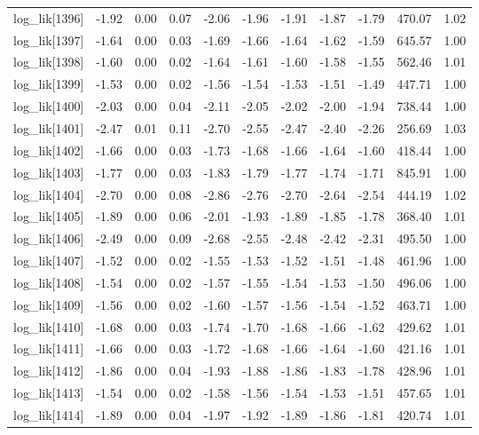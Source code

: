 \begin{table}[ht]
\begin{tabular}{rrrrrrrrrrr}
  log\_lik[1396] & -1.92 & 0.00 & 0.07 & -2.06 & -1.96 & -1.91 & -1.87 & -1.79 & 470.07 & 1.02 \\ 
  log\_lik[1397] & -1.64 & 0.00 & 0.03 & -1.69 & -1.66 & -1.64 & -1.62 & -1.59 & 645.57 & 1.00 \\ 
  log\_lik[1398] & -1.60 & 0.00 & 0.02 & -1.64 & -1.61 & -1.60 & -1.58 & -1.55 & 562.46 & 1.01 \\ 
  log\_lik[1399] & -1.53 & 0.00 & 0.02 & -1.56 & -1.54 & -1.53 & -1.51 & -1.49 & 447.71 & 1.00 \\ 
  log\_lik[1400] & -2.03 & 0.00 & 0.04 & -2.11 & -2.05 & -2.02 & -2.00 & -1.94 & 738.44 & 1.00 \\ 
  log\_lik[1401] & -2.47 & 0.01 & 0.11 & -2.70 & -2.55 & -2.47 & -2.40 & -2.26 & 256.69 & 1.03 \\ 
  log\_lik[1402] & -1.66 & 0.00 & 0.03 & -1.73 & -1.68 & -1.66 & -1.64 & -1.60 & 418.44 & 1.00 \\ 
  log\_lik[1403] & -1.77 & 0.00 & 0.03 & -1.83 & -1.79 & -1.77 & -1.74 & -1.71 & 845.91 & 1.00 \\ 
  log\_lik[1404] & -2.70 & 0.00 & 0.08 & -2.86 & -2.76 & -2.70 & -2.64 & -2.54 & 444.19 & 1.02 \\ 
  log\_lik[1405] & -1.89 & 0.00 & 0.06 & -2.01 & -1.93 & -1.89 & -1.85 & -1.78 & 368.40 & 1.01 \\ 
  log\_lik[1406] & -2.49 & 0.00 & 0.09 & -2.68 & -2.55 & -2.48 & -2.42 & -2.31 & 495.50 & 1.00 \\ 
  log\_lik[1407] & -1.52 & 0.00 & 0.02 & -1.55 & -1.53 & -1.52 & -1.51 & -1.48 & 461.96 & 1.00 \\ 
  log\_lik[1408] & -1.54 & 0.00 & 0.02 & -1.57 & -1.55 & -1.54 & -1.53 & -1.50 & 496.06 & 1.00 \\ 
  log\_lik[1409] & -1.56 & 0.00 & 0.02 & -1.60 & -1.57 & -1.56 & -1.54 & -1.52 & 463.71 & 1.00 \\ 
  log\_lik[1410] & -1.68 & 0.00 & 0.03 & -1.74 & -1.70 & -1.68 & -1.66 & -1.62 & 429.62 & 1.01 \\ 
  log\_lik[1411] & -1.66 & 0.00 & 0.03 & -1.72 & -1.68 & -1.66 & -1.64 & -1.60 & 421.16 & 1.01 \\ 
  log\_lik[1412] & -1.86 & 0.00 & 0.04 & -1.93 & -1.88 & -1.86 & -1.83 & -1.78 & 428.96 & 1.01 \\ 
  log\_lik[1413] & -1.54 & 0.00 & 0.02 & -1.58 & -1.56 & -1.54 & -1.53 & -1.51 & 457.65 & 1.01 \\ 
  log\_lik[1414] & -1.89 & 0.00 & 0.04 & -1.97 & -1.92 & -1.89 & -1.86 & -1.81 & 420.74 & 1.01 \\ 

\end{tabular}
\end{table}
